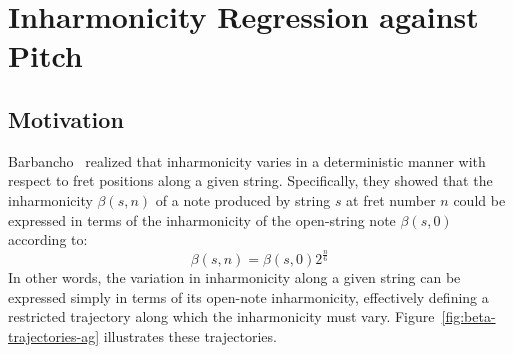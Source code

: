 \documentclass[12pt]{cmuthesis}
\begin{document}

\noindent
\chapter{Inharmonicity Regression against Pitch}
\section{Motivation}
Barbancho~\cite{barbanchoi2012} realized that inharmonicity varies in a deterministic manner with respect to fret positions along a given string. Specifically, they showed that the inharmonicity $\beta(s,n)$ of a note produced by string $s$ at fret number $n$ could be expressed in terms of the inharmonicity of the open-string note $\beta(s,0)$ according to:
\begin{equation} 
\label{eq:beta-traj}
\beta(s,n) = \beta(s,0)2^{\frac{n}{6}}
\end{equation}
In other words, the variation in inharmonicity along a given string can be expressed simply in terms of its open-note inharmonicity, effectively defining a restricted trajectory along which the inharmonicity must vary. Figure~\ref{fig:beta-trajectories-ag} illustrates these trajectories.
\end{document}
